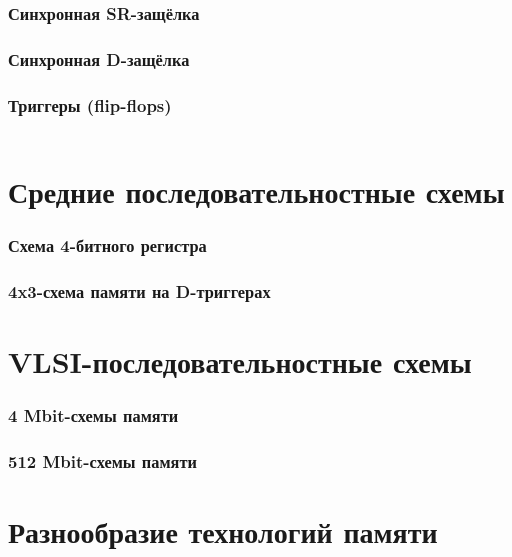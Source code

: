 \begin{frame}
\frametitle{Синхронная SR-защёлка}
\end{frame}

\begin{frame}
\frametitle{Синхронная D-защёлка}
\end{frame}


\begin{frame}
\frametitle{Триггеры (flip-flops)}\vspace{-.7cm}
\begin{columns}
    \column{5cm} \pause{}
    \column{7cm} \pause{}
\end{columns}
\end{frame}

\section{Средние последовательностные схемы}

\begin{frame}
\frametitle{Схема 4-битного регистра}
\end{frame}

\begin{frame}[plain]
\frametitle{4x3-схема памяти на D-триггерах}
\end{frame}

\section{VLSI-последовательностные схемы}

\begin{frame}
\frametitle{4 Mbit-схемы памяти}
\end{frame}

\begin{frame}
\frametitle{512 Mbit-схемы памяти}
\end{frame}

\section{Разнообразие технологий памяти}

